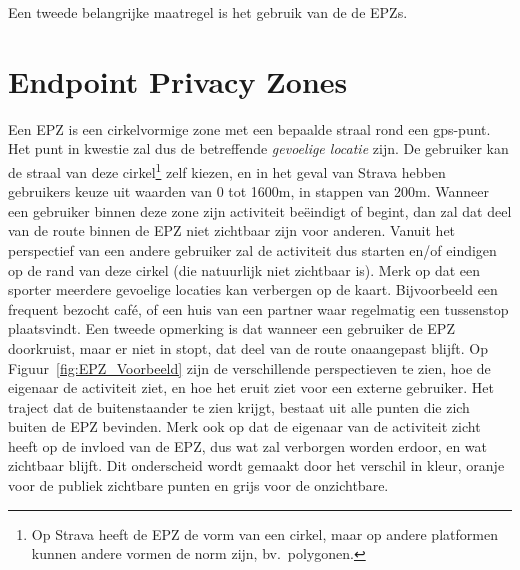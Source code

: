 Een tweede belangrijke maatregel is het gebruik van de de \acp{EPZ}.

\section{Endpoint Privacy Zones}\label{sec:EPZ}
Een \ac{EPZ} is een cirkelvormige zone met een bepaalde straal rond een
\ac{gps}-punt. Het punt in kwestie zal dus de betreffende \textit{gevoelige
    locatie} zijn. De gebruiker kan de straal van deze cirkel\footnote{Op Strava
    heeft de \ac{EPZ} de vorm van een cirkel, maar op andere platformen kunnen
    andere vormen de norm zijn, bv.\ polygonen.} zelf kiezen, en in het geval van
Strava hebben gebruikers keuze uit waarden van 0 tot 1600m, in stappen van
200m. Wanneer een gebruiker binnen deze zone zijn activiteit beëindigt of
begint, dan zal dat deel van de route binnen de \ac{EPZ} niet zichtbaar zijn
voor anderen. Vanuit het perspectief van een andere gebruiker zal de activiteit
dus starten en/of eindigen op de rand van deze cirkel (die natuurlijk niet
zichtbaar is). Merk op dat een sporter meerdere gevoelige locaties kan
verbergen op de kaart. Bijvoorbeeld een frequent bezocht café, of een huis van
een partner waar regelmatig een tussenstop plaatsvindt. Een tweede opmerking is
dat wanneer een gebruiker de \ac{EPZ} doorkruist, maar er niet in stopt, dat
deel van de route onaangepast blijft. Op Figuur~\ref{fig:EPZ_Voorbeeld} zijn de
verschillende perspectieven te zien, hoe de eigenaar de activiteit ziet, en hoe
het eruit ziet voor een externe gebruiker. Het traject dat de buitenstaander te
zien krijgt, bestaat uit alle punten die zich buiten de \ac{EPZ} bevinden. Merk
ook op dat de eigenaar van de activiteit zicht heeft op de invloed van de
\ac{EPZ}, dus wat zal verborgen worden erdoor, en wat zichtbaar blijft. Dit
onderscheid wordt gemaakt door het verschil in kleur, oranje voor de publiek
zichtbare punten en grijs voor de onzichtbare.
